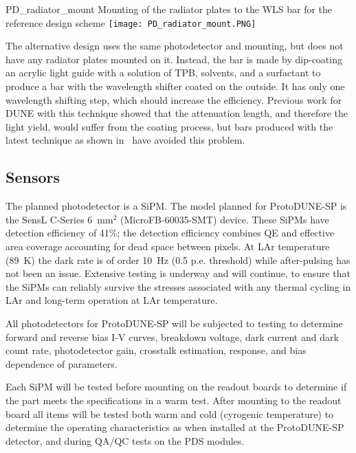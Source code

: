 \begin{cdrfigure}{PD_radiator_mount}
  {Mounting of the radiator plates to the WLS bar for the reference design scheme}
\texttt{[image: PD\_radiator\_mount.PNG]}
\end{cdrfigure}

The alternative design uses the same photodetector and mounting, but does not have
any radiator plates mounted on it.  
Instead, the bar is made by dip-coating an acrylic light guide with a solution
of TPB, solvents, and a surfactant to produce a bar with the wavelength shifter coated
on the outside.  
It has only one wavelength shifting step, which should increase the efficiency.  
Previous work for DUNE with this technique showed that the attenuation length, and
therefore the light yield, would suffer from the coating process, but bars produced with
the latest technique as shown in~\cite{conrad_jinst2015} have %
avoided this problem.




\subsection{Sensors}
The planned photodetector is a SiPM.  
The model planned for ProtoDUNE-SP is the SensL C-Series 6~mm$^2$
(MicroFB-60035-SMT) device. These SiPMs have detection efficiency of
41\%; the detection efficiency combines QE and effective area
  coverage accounting for dead space between pixels.   At LAr temperature (89~K) the dark rate is of order 10~Hz
(0.5 p.e. threshold) while after-pulsing has not been an
issue. Extensive testing is underway and will continue, to ensure 
that the SiPMs can reliably survive the stresses associated with 
any thermal cycling in LAr and long-term operation at LAr temperature.

All photodetectors for ProtoDUNE-SP will be subjected to testing to determine
 forward and reverse bias I-V curves,
 breakdown voltage, dark current and dark count rate, photodetector gain, crosstalk estimation, response, and bias dependence of parameters.
 
Each SiPM will be tested before mounting on the readout boards to determine
if the part meets the specifications in a warm test.  After mounting to
the readout board all items will be tested both warm and cold (cyrogenic 
temperature) to determine the operating characteristics as when %
installed at the ProtoDUNE-SP detector, and during QA/QC tests on the PDS modules.

